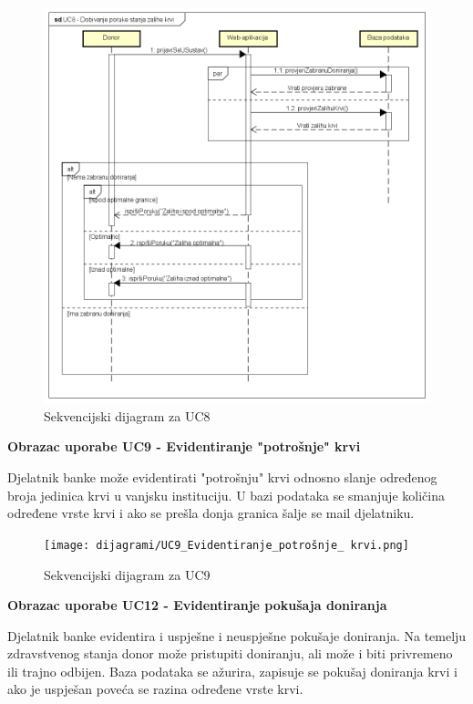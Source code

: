 \begin{figure}[H]
	\centering
	\includegraphics[width=\textwidth, scale=0.4]{dijagrami/UC8_Dobivanje poruke stanja zalihe krvi.png}
	\caption{Sekvencijski dijagram za UC8}
	\label{fig:UC8_Dobivanje poruke stanja zalihe krvi}
\end{figure}
\eject

\textbf{Obrazac uporabe UC9 - Evidentiranje "potrošnje" krvi}

Djelatnik banke može evidentirati "potrošnju" krvi odnosno slanje određenog broja jedinica krvi u vanjsku instituciju. U bazi podataka se smanjuje količina određene vrste krvi i ako se prešla donja granica šalje se mail djelatniku.

\begin{figure}[H]
	\centering
	\texttt{[image: dijagrami/UC9\_Evidentiranje\_potrošnje\_ krvi.png]}
	\caption{Sekvencijski dijagram za UC9}
\end{figure}

\eject 
\textbf{Obrazac uporabe UC12 - Evidentiranje pokušaja doniranja}

Djelatnik banke evidentira i uspješne i neuspješne pokušaje doniranja. Na temelju zdravstvenog stanja donor može pristupiti doniranju, ali može i biti privremeno ili trajno odbijen. Baza podataka se ažurira, zapisuje se pokušaj doniranja krvi i ako je uspješan poveća se razina određene vrste krvi.

